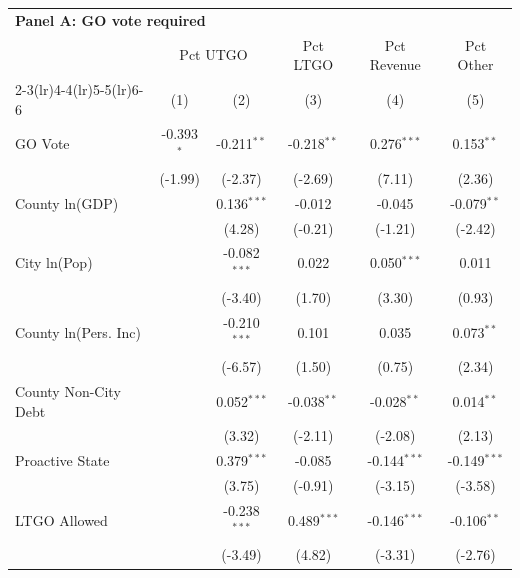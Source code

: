 \begingroup
\centering
\begin{tabular*}{\textwidth}{@{\extracolsep{\fill}}lccccc}
\multicolumn{5}{l}{\textbf{Panel A: GO vote required}}\\

\addlinespace
   \toprule
    & \multicolumn{2}{c}{Pct UTGO} & Pct LTGO & Pct Revenue & Pct Other\\
   \cmidrule(lr){2-3}\cmidrule(lr){4-4}\cmidrule(lr){5-5}\cmidrule(lr){6-6}
                        & (1)          & (2)            & (3)           & (4)            & (5)\\  
   \midrule 
   GO Vote              & -0.393$^{*}$ & -0.211$^{**}$  & -0.218$^{**}$ & 0.276$^{***}$  & 0.153$^{**}$\\   
                        & (-1.99)     & (-2.37)       & (-2.69)      & (7.11)        & (2.36)\\   
   County ln(GDP)       &              & 0.136$^{***}$  & -0.012        & -0.045         & -0.079$^{**}$\\   
                        &              & (4.28)        & (-0.21)      & (-1.21)       & (-2.42)\\   
   City ln(Pop)         &              & -0.082$^{***}$ & 0.022         & 0.050$^{***}$  & 0.011\\   
                        &              & (-3.40)       & (1.70)       & (3.30)        & (0.93)\\   
   County ln(Pers. Inc) &              & -0.210$^{***}$ & 0.101         & 0.035          & 0.073$^{**}$\\   
                        &              & (-6.57)       & (1.50)       & (0.75)        & (2.34)\\   
   County Non-City Debt &              & 0.052$^{***}$  & -0.038$^{**}$ & -0.028$^{**}$  & 0.014$^{**}$\\   
                        &              & (3.32)        & (-2.11)      & (-2.08)       & (2.13)\\   
   Proactive State      &              & 0.379$^{***}$  & -0.085        & -0.144$^{***}$ & -0.149$^{***}$\\   
                        &              & (3.75)        & (-0.91)      & (-3.15)       & (-3.58)\\   
   LTGO Allowed         &              & -0.238$^{***}$ & 0.489$^{***}$ & -0.146$^{***}$ & -0.106$^{**}$\\   
                        &              & (-3.49)       & (4.82)       & (-3.31)       & (-2.76)\\   

\end{tabular*}
